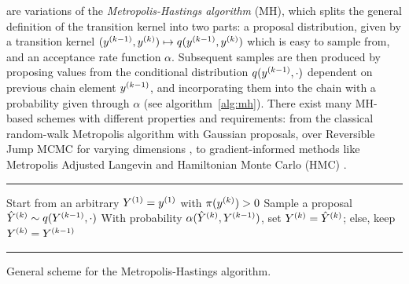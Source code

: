  are variations of the \emph{Metropolis-Hastings algorithm}
(MH), which splits the general definition of the transition kernel into two parts: a proposal
distribution, given by a transition kernel
\((\kth[k-1]{y}, \kth{y}) \mapsto q(\kth[k-1]{y}, \kth{y})\) which is easy to sample from, and an
acceptance rate function \(\alpha\).  Subsequent samples are then produced by proposing values from
the conditional distribution \(q(\kth[k-1]{y}, \cdot)\) dependent on previous chain element
\(\kth[k-1]{y}\), and incorporating them into the chain with a probability given through \(\alpha\)
(see algorithm~\ref{alg:mh}).  There exist many MH-based schemes with different properties and
requirements: from the classical random-walk Metropolis algorithm with Gaussian proposals, over
Reversible Jump MCMC for varying dimensions \parencite{green1995reversible}, to gradient-informed
methods like Metropolis Adjusted Langevin and Hamiltonian Monte Carlo (HMC)
\parencite{betancourt2018conceptual,girolami2011riemann}.


\begin{algorithm}[t]
  \hrule
  \begin{algorithmic}
    \State Start from an arbitrary \(\kth[1]{Y} = \kth[1]{y}\) with \(\pi(\kth{y}) > 0\)
    \State Sample a proposal \(\kth[k]{\hat{Y}} \from q(\kth[k-1]{Y}, \cdot)\)
    \State With probability \(\alpha(\kth[k]{\hat{Y}}, \kth[k-1]{Y})\), set
    \(\kth[k]{Y} = \kth[k]{\hat{Y}}\); else, keep \(\kth[k]{Y} = \kth[k-1]{Y}\)
    \EndFor
  \end{algorithmic}
  \hrule
  \caption{General scheme for the Metropolis-Hastings algorithm.\label{alg:mh}}
\end{algorithm}

